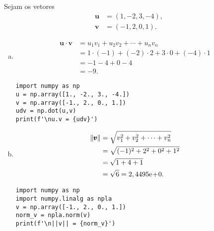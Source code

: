 \begin{ex}
  Sejam os vetores
  \begin{align}
    \pmb{u} &= (1, -2, 3, -4),\\
    \pmb{v} &= (-1, 2, 0, 1).
  \end{align}
  \begin{enumerate}[a)]
  \item
    \begin{align}
      \pmb{u}\cdot\pmb{v} &= u_1v_1 + u_2v_2 + \cdots + u_nv_n\\
                          &= 1\cdot(-1) + (-2)\cdot 2 + 3\cdot 0 + (-4)\cdot 1\\
                          &= -1 - 4 + 0 - 4\\
                          &= -9.
    \end{align}

\begin{lstlisting}
import numpy as np
u = np.array([1., -2., 3., -4.])
v = np.array([-1., 2., 0., 1.])
udv = np.dot(u,v)
print(f'\nu.v = {udv}')
\end{lstlisting}

  \item
    \begin{align}
      \|\pmb{v}\| &= \sqrt{v_1^2 + v_2^2 + \cdots + v_n^2}\\
                  &= \sqrt{(-1)^2 + 2^2 + 0^2 + 1^2}\\
                  &= \sqrt{1 + 4 + 1}\\
                  &= \sqrt{6} = 2,4495\mathrm{e}\!+\!0.
    \end{align}

\begin{lstlisting}
import numpy as np
import numpy.linalg as npla
v = np.array([-1., 2., 0., 1.])
norm_v = npla.norm(v)
print(f'\n||v|| = {norm_v}')
\end{lstlisting}

  \end{enumerate}
\end{ex}


